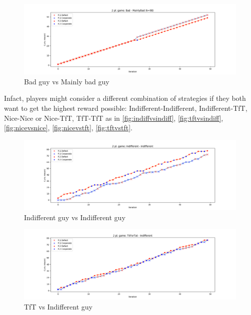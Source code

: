 \documentclass[journal,a4paper,10pt,twoside]{IEEEtran}
\begin{document}
\begin{figure}
    \centering
    \includegraphics[width=1\columnwidth]{img_v1/idp2p-rewards-Bad-MainlyBad (k=98).png}
    \caption{Bad guy vs Mainly bad guy}
    \label{fig:badvsmainlybad}
\end{figure}

Infact, players might consider a different combination of strategies if they both want to get the highest reward possible: Indifferent-Indifferent, Indifferent-TfT, Nice-Nice or Nice-TfT, TfT-TfT as in \autoref{fig:indiffvsindiff}, \autoref{fig:tftvsindiff}, \autoref{fig:nicevsnice}, \autoref{fig:nicevstft}, \autoref{fig:tftvstft}.

\begin{figure}
    \centering
    \includegraphics[width=1\columnwidth]{img_v1/idp2p-rewards-Indifferent-Indifferent.png}
    \caption{Indifferent guy vs Indifferent guy}
    \label{fig:indiffvsindiff}
\end{figure}

\begin{figure}
    \centering
    \includegraphics[width=1\columnwidth]{img_v1/idp2p-rewards-TitForTat-Indifferent.png}
    \caption{TfT vs Indifferent guy}
    \label{fig:tftvsindiff}
\end{figure}
\end{document}
